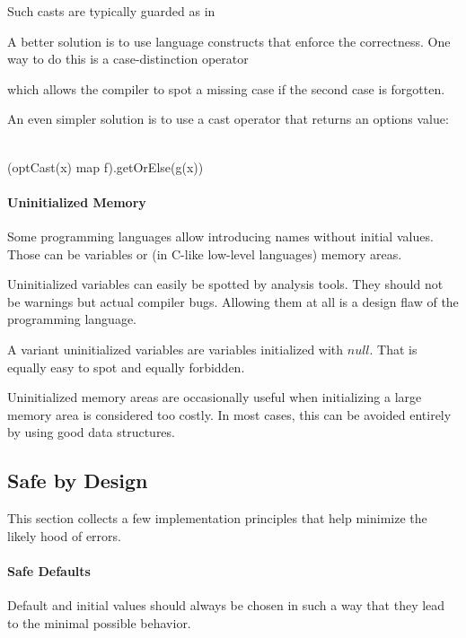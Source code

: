 Such casts are typically guarded as in
\begin{acode}
\end{acode}

A better solution is to use language constructs that enforce the correctness.
One way to do this is a case-distinction operator
\begin{acode}
\end{acode}
which allows the compiler to spot a missing case if the second case is forgotten.

An even simpler solution is to use a cast operator that returns an options value:
\begin{acode}
\\
(optCast(x)\; map\; f).getOrElse(g(x))
\end{acode}

\paragraph{Uninitialized Memory}
Some programming languages allow introducing names without initial values.
Those can be variables or (in C-like low-level languages) memory areas.

Uninitialized variables can easily be spotted by analysis tools.
They should not be warnings but actual compiler bugs.
Allowing them at all is a design flaw of the programming language.

A variant uninitialized variables are variables initialized with $null$.
That is equally easy to spot and equally forbidden.

Uninitialized memory areas are occasionally useful when initializing a large memory area is considered too costly.
In most cases, this can be avoided entirely by using good data structures.


\subsection{Safe by Design}

This section collects a few implementation principles that help minimize the likely hood of errors.

\paragraph{Safe Defaults}
Default and initial values should always be chosen in such a way that they lead to the minimal possible behavior.

